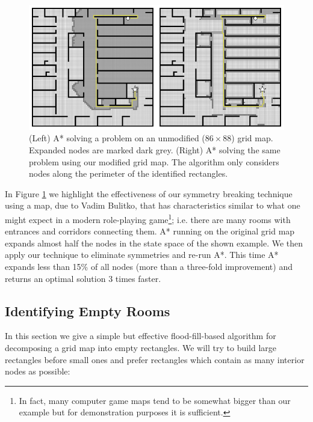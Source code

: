 \begin{figure}[t]
\centering
\includegraphics[width=0.95\columnwidth, trim = 10mm 10mm 10mm 0mm]{chapter_rsr/diagrams/rsr_example.png}
\caption[Searching with A{*} vs. A{*} + RSR] 
{\small
(Left) A* solving a problem on an unmodified ($86\times88$) grid map. 
Expanded nodes are marked dark grey.
(Right) A* solving the same problem using our modified grid map. 
The algorithm only considers nodes along the perimeter of the identified rectangles.}
\label{fig::rsr::contrast}
\end{figure}

In Figure \ref{fig::rsr::contrast} we highlight the effectiveness of our
symmetry breaking technique using a map, due to Vadim Bulitko, that has
characteristics similar to what one might expect in a modern role-playing
game\footnote{In fact, many computer game maps tend to be somewhat bigger than
our example but for demonstration purposes it is sufficient.}; i.e. there are
many rooms with entrances and corridors connecting them.  A* running on the
original grid map expands almost half the nodes in the state space of the
shown example.  We then apply our technique to eliminate symmetries and re-run
A*.  This time A* expands less than 15\% of all nodes (more than a three-fold
improvement) and returns an optimal solution 3 times faster.

\subsection{Identifying Empty Rooms}
\label{cha::rsr::rectangles}
In this section we give a simple but effective flood-fill-based algorithm for decomposing a 
grid map into empty rectangles.
We will try to build large rectangles before small ones and prefer rectangles which
contain as many interior nodes as possible:

